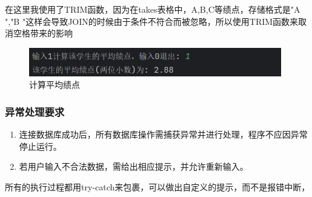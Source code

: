 \documentclass{article}
\begin{document}
	\begin{tcolorbox}[title = {TRIM函数的使用}, colback = blue!25!white, colframe = blue!75!black]
		在这里我使用了TRIM函数，因为在takes表格中，A,B,C等绩点，存储格式是"A ","B "这样会导致JOIN的时候由于条件不符合而被忽略，所以使用TRIM函数来取消空格带来的影响
	\end{tcolorbox}
	
	\begin{figure}[H]
		\centering
		\includegraphics[width=11cm]{./images/23.计算平均绩点.png}
		\caption{计算平均绩点}
	\end{figure}
	
	\subsubsection{异常处理要求}
	\begin{enumerate}
		\item 连接数据库成功后，所有数据库操作需捕获异常并进行处理，程序不应因异常停止运行。
		\item 若用户输入不合法数据，需给出相应提示，并允许重新输入。
	\end{enumerate}
	
	所有的执行过程都用try-catch来包裹，可以做出自定义的提示，而不是报错中断，
	
	
\end{document}
